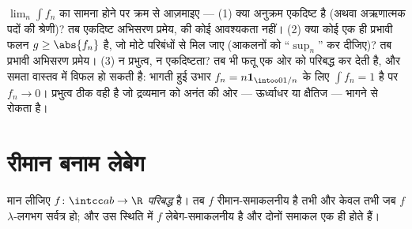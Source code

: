 \begin{method}\label{met:b3:lebesgue:convergence}
$\lim_n\int f_n$ का सामना होने पर क्रम से आज़माइए --- (1) क्या अनुक्रम
एकदिष्ट है (अथवा अऋणात्मक पदों की श्रेणी)? तब एकदिष्ट अभिसरण
प्रमेय,  की कोई आवश्यकता नहीं। (2) क्या कोई एक ही
 प्रभावी फलन $g \geq \abs{f_n}$ है, जो मोटे परिबंधों से मिल जाए
(आकलनों को ``$\sup_n$'' कर दीजिए)? तब प्रभावी अभिसरण प्रमेय। (3)
न प्रभुत्व, न एकदिष्टता? तब भी फतू एक ओर को परिबद्ध कर देती है,
और समता वास्तव में विफल हो सकती है: भागती हुई उभार $f_n = n\mathbf
1_{\intoo0{1/n}}$ के लिए
$\int f_n = 1$ है पर  $f_n \to 0$। प्रभुत्व ठीक वही है जो द्रव्यमान
को अनंत की ओर --- ऊर्ध्वाधर या क्षैतिज --- भागने से रोकता है।
\end{method}

\section{रीमान बनाम लेबेग}

\begin{theorem}[लेबेग की कसौटी]
\label{thm:b3:lebesgue:riemann}
मान लीजिए $f \colon \intcc ab \to \R$ \emph{परिबद्ध} है। तब $f$ रीमान-समाकलनीय है तभी
और केवल तभी जब $f$ $\lambda$-लगभग सर्वत्र  हो; और उस स्थिति में
$f$ लेबेग-समाकलनीय है और दोनों समाकल एक ही होते हैं।
\end{theorem}

